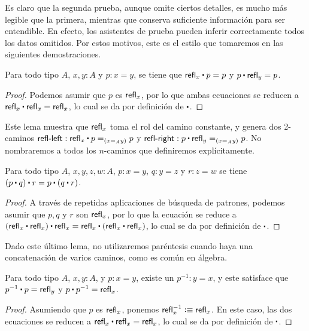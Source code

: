 \documentclass[../main.tex]{subfiles}
\begin{document}
Es claro que la segunda prueba, aunque omite ciertos detalles, es mucho m\'as legible que la primera, mientras que conserva suficiente informaci\'on para ser entendible.
En efecto, los asistentes de prueba pueden inferir correctamente todos los datos omitidos.
Por estos motivos, este es el estilo que tomaremos en las siguientes demostraciones.

\begin{lemma}\label{reflright}
  Para todo tipo $A$, $x,y:A$ y $p:x=y$, se tiene que $\refl{x} \ct p = p$ y $p \ct \refl{y} = p$.
\end{lemma}
\begin{proof}
  Podemos asumir que $p$ es $\mathsf{refl}_{x}$, por lo que ambas ecuaciones se reducen a $\refl{x} \ct \refl{x} = \refl{x}$, lo cual se da por definición de $\ct$.
\end{proof}

Este lema muestra que $\mathsf{refl}_{x}$ toma el rol del camino constante, y genera dos 2-caminos $\mathsf{refl\text{-}left}: \id[{(\id[A]{x}{y})}]{\refl{x} \ct p}{p}$ y $\mathsf{refl\text{-}right}: \id[{(\id[A]{x}{y})}]{p \ct \refl{y}}{p}$.
No nombraremos a todos los $n$-caminos que definiremos expl\'icitamente.

\begin{lemma}\label{assoc}
  Para todo tipo $A$, $x,y,z,w:A$, $p:x=y$, $q:y=z$ y $r:z=w$ se tiene $(p \ct q) \ct r = p \ct (q \ct r)$.
\end{lemma}
\begin{proof}
  A trav\'es de repetidas aplicaciones de b\'usqueda de patrones, podemos asumir que $p,q$ y $r$ son $\mathsf{refl}_{x}$, por lo que la ecuaci\'on se reduce a $(\refl{x} \ct \refl{x}) \ct \refl{x} = \refl{x} \ct (\refl{x} \ct \refl{x})$, lo cual se da por definición de $\ct$.
\end{proof}

Dado este \'ultimo lema, no utilizaremos paréntesis cuando haya una concatenaci\'on de varios caminos, como es com\'un en \'algebra.

\begin{lemma} \label{-1lema}
  Para todo tipo $A$, $x,y:A$, y $p:x=y$, existe un $p^{-1}:y=x$, y este satisface que $p^{-1} \ct p=\refl{y}$ y $p \ct p^{-1}=\refl{x}$.
\end{lemma}
\begin{proof}
  Asumiendo que $p$ es $\mathsf{refl}_{x}$, ponemos $\mathsf{refl}_{x}^{-1}\vcentcolon\equiv \mathsf{refl}_{x}$.
  En este caso, las dos ecuaciones se reducen a $\refl{x} \ct \refl{x} = \refl{x}$, lo cual se da por definición de $\ct$.
\end{proof}
\end{document}
